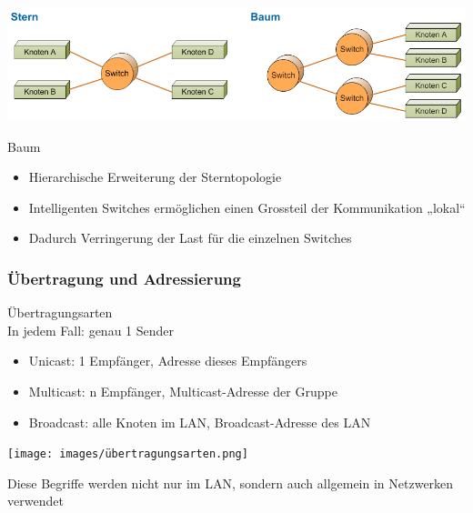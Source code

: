  
    \centering
    \includegraphics[width=0.9\linewidth]{images/stern_baum_topo.png}
 

\begin{definition}{Baum}
    \begin{itemize}
        \item Hierarchische Erweiterung der Sterntopologie
        \item Intelligenten Switches ermöglichen einen Grossteil der Kommunikation „lokal“
        \item Dadurch Verringerung der Last für die einzelnen Switches
    \end{itemize}
\end{definition}

\subsubsection{Übertragung und Adressierung}

\begin{definition}{Übertragungsarten}\\
    In jedem Fall: genau 1 Sender
    \begin{itemize}
        \item Unicast: 1 Empfänger, Adresse dieses Empfängers
        \item Multicast: n Empfänger, Multicast-Adresse der Gruppe
        \item Broadcast: alle Knoten im LAN, Broadcast-Adresse des LAN
    \end{itemize}
    \begin{minipage}{0.35\linewidth}
        \texttt{[image: images/übertragungsarten.png]}
    \end{minipage}
    \begin{minipage}{0.6\linewidth}
        Diese Begriffe werden nicht nur im LAN, sondern auch allgemein in Netzwerken verwendet
    \end{minipage}
\end{definition}

